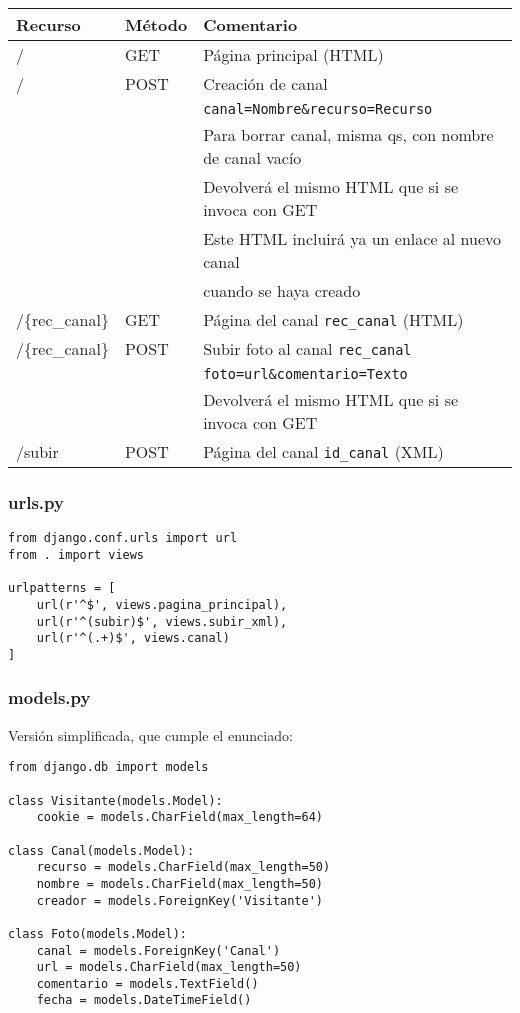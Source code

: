 \begin{tabular}{|l|l|l|}
  \hline
  Recurso & Método & Comentario \\ \hline \hline
  /       & GET    & Página principal (HTML) \\ \hline
  /       & POST   & Creación de canal \\
          &        & \verb|canal=Nombre&recurso=Recurso| \\
          &        & Para borrar canal, misma qs, con nombre de canal vacío \\
          &        & Devolverá el mismo HTML que si se invoca con GET \\
          &        & Este HTML incluirá ya un enlace al nuevo canal \\
          &        & cuando se haya creado \\ \hline
  /\{rec\_canal\} & GET & Página del canal \verb|rec_canal| (HTML) \\ \hline
  /\{rec\_canal\} & POST & Subir foto al canal \verb|rec_canal| \\
          &        & \verb|foto=url&comentario=Texto| \\
          &        & Devolverá el mismo HTML que si se invoca con GET \\ \hline
  /subir  & POST   & Página del canal \verb|id_canal| (XML) \\ \hline
\end{tabular}

\subsubsection*{urls.py}

\begin{verbatim}
from django.conf.urls import url
from . import views

urlpatterns = [
    url(r'^$', views.pagina_principal),
    url(r'^(subir)$', views.subir_xml),
    url(r'^(.+)$', views.canal)
]
\end{verbatim}

\subsubsection*{models.py}

Versión simplificada, que cumple el enunciado:

\begin{verbatim}
from django.db import models

class Visitante(models.Model):
    cookie = models.CharField(max_length=64)

class Canal(models.Model):
    recurso = models.CharField(max_length=50)
    nombre = models.CharField(max_length=50)
    creador = models.ForeignKey('Visitante')

class Foto(models.Model):
    canal = models.ForeignKey('Canal')
    url = models.CharField(max_length=50)
    comentario = models.TextField()
    fecha = models.DateTimeField()
\end{verbatim}


